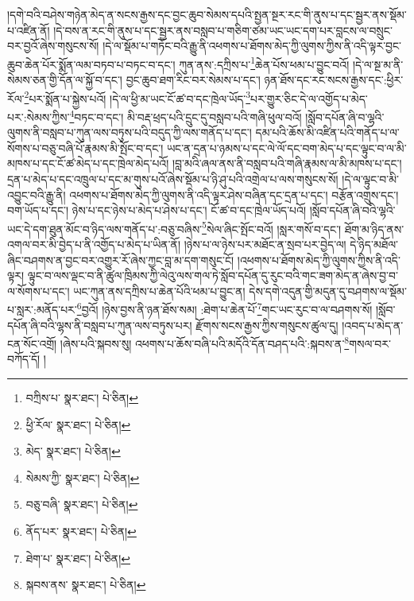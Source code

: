 །དགེ་བའི་བཤེས་གཉེན་མེད་ན་སངས་རྒྱས་དང་བྱང་ཆུབ་སེམས་དཔའི་སྤྱན་སྔར་རང་གི་ནུས་པ་དང་སྦྱར་ནས་སྡོམ་པ་འཛིན་ནོ། །དེ་བས་ན་རང་གི་ནུས་པ་དང་སྦྱར་ནས་བསླབ་པ་གཅིག་ཙམ་ཡང་ཡང་དག་པར་བླངས་ལ་བསྲུང་བར་བྱའོ་ཞེས་གསུངས་སོ། །དེ་ལ་སྡོམ་པ་གཏོང་བའི་རྒྱུ་ནི་འཕགས་པ་ཐོགས་མེད་ཀྱི་ལུགས་ཀྱིས་ནི་འདི་ལྟར་བྱང་ཆུབ་ཆེན་པོར་སྨོན་ལམ་བཏབ་པ་བཏང་བ་དང་། ཀུན་ནས་:དཀྲིས་པ་\footnote{བཀྲིས་པ་  སྣར་ཐང་།  པེ་ཅིན། }ཆེན་པོས་ཕམ་པ་བྱུང་བའོ། །དེ་ལ་སྔ་མ་ནི་སེམས་ཅན་གྱི་དོན་ལ་སྐྱོ་བ་དང་། བྱང་ཆུབ་ཐག་རིང་བར་སེམས་པ་དང་། ཉན་ཐོས་དང་རང་སངས་རྒྱས་དང་:ཕྱིར་རོལ་\footnote{ཕྱི་རོལ་  སྣར་ཐང་།  པེ་ཅིན། }པར་སྨོན་པ་སྐྱེས་པའོ། །དེ་ལ་ཕྱི་མ་ཡང་ངོ་ཚ་བ་དང་ཁྲེལ་ཡོད་\footnote{མེད་  སྣར་ཐང་།  པེ་ཅིན། }པར་གྱུར་ཅིང་དེ་ལ་འགྱོད་པ་མེད་པར་:སེམས་ཀྱིས་\footnote{སེམས་ཀྱི་  སྣར་ཐང་།  པེ་ཅིན། }བཏང་བ་དང་། མི་བརྡ་ཕྲད་པའི་དྲུང་དུ་བསླབ་པའི་གཞི་ཕུལ་བའོ། །སློབ་དཔོན་ཞི་བ་ལྷའི་ལུགས་ནི་བསླབ་པ་ཀུན་ལས་བཏུས་པའི་བདུད་ཀྱི་ལས་གནོད་པ་དང་། དམ་པའི་ཆོས་མི་འཛིན་པའི་གནོད་པ་ལ་སོགས་པ་བཅུ་བཞི་པོ་རྣམས་མི་སྤོང་བ་དང་། ཡང་ན་དྲན་པ་ཉམས་པ་དང་ལེ་ལོ་དང་བག་མེད་པ་དང་ལྟུང་བ་ལ་མི་མཁས་པ་དང་ངོ་ཚ་མེད་པ་དང་ཁྲེལ་མེད་པའོ། །བླ་མའི་ཞལ་ནས་ནི་བསླབ་པའི་གཞི་རྣམས་ལ་མི་མཁས་པ་དང་། དྲན་པ་མེད་པ་དང་འཁྲུལ་པ་དང་མ་གུས་པའོ་ཞེས་སྡོམ་པ་ཉི་ཤུ་པའི་འགྲེལ་པ་ལས་གསུངས་སོ། །དེ་ལ་ལྟུང་བ་མི་འབྱུང་བའི་རྒྱུ་ནི། འཕགས་པ་ཐོགས་མེད་ཀྱི་ལུགས་ནི་འདི་ལྟར་ཤེས་བཞིན་དང་དྲན་པ་དང་། བརྩོན་འགྲུས་དང་། བག་ཡོད་པ་དང་། ཉེས་པ་དང་ཉེས་པ་མེད་པ་ཤེས་པ་དང་། ངོ་ཚ་བ་དང་ཁྲེལ་ཡོད་པའོ། །སློབ་དཔོན་ཞི་བའི་ལྷའི་ཡང་དེ་དག་ཐུན་མོང་བ་ཉིད་ལས་གནོད་པ་:བཅུ་བཞིས་\footnote{བཅུ་བཞི་  སྣར་ཐང་།  པེ་ཅིན། }སེལ་ཞིང་སྤོང་བའོ། །སླར་གསོ་བ་དང་། ཐོག་མ་ཉིད་ནས་འགལ་བར་མི་བྱེད་པ་ནི་འགྱོད་པ་མེད་པ་ཡིན་ནོ། །ཉེས་པ་ལ་ཉེས་པར་མཐོང་ན་སྲབ་པར་བྱེད་ལ། དེ་ཉིད་མཐོལ་ཞིང་བཤགས་ན་བྱང་བར་འགྱུར་རོ་ཞེས་ཀྱང་བླ་མ་དག་གསུང་ངོ། །འཕགས་པ་ཐོགས་མེད་ཀྱི་ལུགས་ཀྱིས་ནི་འདི་ལྟར། ལྟུང་བ་ལས་ལྡང་བ་ནི་ཚུལ་ཁྲིམས་ཀྱི་ལེའུ་ལས་གལ་ཏེ་སློབ་དཔོན་དུ་རུང་བའི་གང་ཟག་མེད་ན་ཞེས་བྱ་བ་ལ་སོགས་པ་དང་། ཡང་ཀུན་ནས་དཀྲིས་པ་ཆེན་པོའི་ཕམ་པ་བྱུང་ན། དེས་དགེ་འདུན་གྱི་མདུན་དུ་བཤགས་ལ་སྡོམ་པ་སླར་:མནོད་པར་\footnote{ནོད་པར་  སྣར་ཐང་།  པེ་ཅིན། }བྱའོ། །ཉེས་བྱས་ནི་ཉན་ཐོས་སམ། :ཐེག་པ་ཆེན་པོ་\footnote{ཐེག་པ་  སྣར་ཐང་།  པེ་ཅིན། }གང་ཡང་རུང་བ་ལ་བཤགས་སོ། །སློབ་དཔོན་ཞི་བའི་ལྷས་ནི་བསླབ་པ་ཀུན་ལས་བཏུས་པར། རྫོགས་སངས་རྒྱས་ཀྱིས་གསུངས་ཚུལ་དུ། །འབད་པ་མེད་ན་ངན་སོང་འགྲོ། །ཞེས་པའི་སྐབས་སུ། འཕགས་པ་ཆོས་བཞི་པའི་མདོའི་དོན་བཤད་པའི་:སྐབས་ན་\footnote{སྐབས་ནས་  སྣར་ཐང་།  པེ་ཅིན། }གསལ་བར་བཀོད་དོ། །

